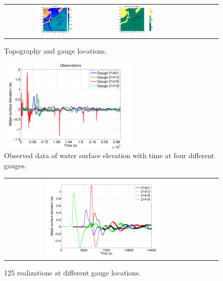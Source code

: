\begin{figure}[h]
\centering
\begin{tabular}{clc}
\includegraphics[width=0.45\textwidth]{./figures/topo.pdf}  &
\includegraphics[width=0.45\textwidth]{./figures/coef.pdf} 
\label{setup}
\end{tabular}
\caption{Topography and gauge locations.}
\label{fig:setup}
\end{figure}
\begin{figure}[h]      
\centering
\includegraphics[width=0.6\textwidth]{./figures/obs.pdf}
\caption{Observed data of water surface elevation with time at four different gauges.}
\label{fig:obs}
\end{figure}  
\begin{figure}[h]
\centering
\begin{tabular}{clc}        
\includegraphics[width=0.6\textwidth]{./figures/rlzs_gauges.pdf} 
\end{tabular}
\caption{125 \geoclaw realizations at different gauge locations.}
\label{fig:rlzs}
\end{figure}

